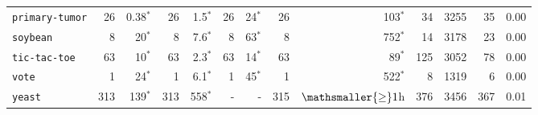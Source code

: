 \begin{tabular}{lrrrrrrrrrrrr}
\texttt{primary-tumor} & 26 & 0.38$^*$ & 26 & 1.5$^*$ & 26 & 24$^*$ & 26 & 103$^*$ & 34 & 3255 & 35 & 0.00\\
\texttt{soybean} & 8 & 20$^*$ & 8 & 7.6$^*$ & 8 & 63$^*$ & 8 & 752$^*$ & 14 & 3178 & 23 & 0.00\\
\texttt{tic-tac-toe} & 63 & 10$^*$ & 63 & 2.3$^*$ & 63 & 14$^*$ & 63 & 89$^*$ & 125 & 3052 & 78 & 0.00\\
\texttt{vote} & 1 & 24$^*$ & 1 & 6.1$^*$ & 1 & 45$^*$ & 1 & 522$^*$ & 8 & 1319 & 6 & 0.00\\
\texttt{yeast} & 313 & 139$^*$ & 313 & 558$^*$ & - & - & 315 & $\mathsmaller{\geq}1$h & 376 & 3456 & 367 & 0.01\\
\bottomrule
\end{tabular}

